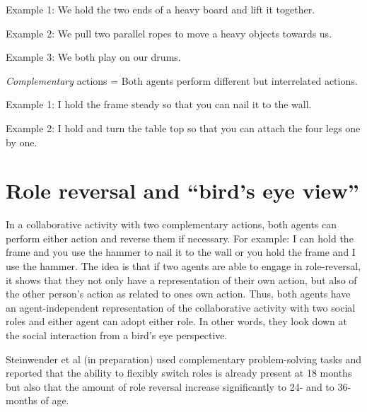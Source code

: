 \documentclass{article}
\begin{document}
Example 1: We hold the two ends of a heavy board and lift it together.

Example 2: We pull two parallel ropes to move a heavy objects towards us.

Example 3: We both play on our drums.

\textit{Complementary} actions = Both agents perform different but interrelated
actions.

Example 1: I hold the frame steady so that you can nail it to the wall.

Example 2: I hold and turn the table top so that you can attach the four legs
one by one.


\section{Role reversal and ``bird's eye view''}

In a collaborative activity with two complementary actions, both agents can
perform either action and reverse them if necessary. For example: I can hold
the frame and you use the hammer to nail it to the wall or you hold the frame
and I use the hammer. The idea is that if two agents are able to engage in
role-reversal, it shows that they not only have a representation of their own
action, but also of the other person's action as related to ones own action.
Thus, both agents have an agent-independent representation of the collaborative
activity with two social roles and either agent can adopt either role. In other
words, they look down at the social interaction from a bird's eye perspective.

Steinwender et al (in preparation) used complementary problem-solving tasks and
reported that the ability to flexibly switch roles is already present at 18
months but also that the amount of role reversal increase significantly to 24-
and  to 36-months of age.
\end{document}
